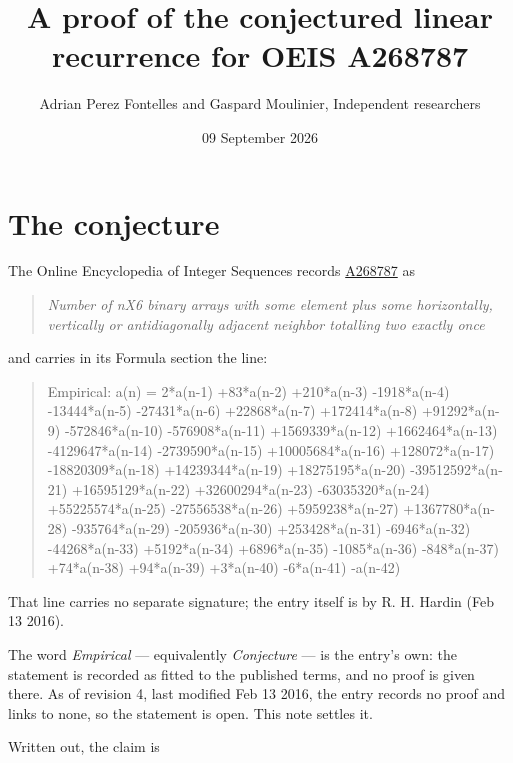 \documentclass[11pt]{article}
\title{A proof of the conjectured linear recurrence for OEIS A268787}
\author{Adrian Perez Fontelles and Gaspard Moulinier, Independent researchers}
\date{09 September 2026}
\theoremstyle{definition}
\begin{document}
\maketitle
\section{The conjecture}

The Online Encyclopedia of Integer Sequences records \href{https://oeis.org/A268787}{A268787} as

\begin{quote}\itshape Number of nX6 binary arrays with some element plus some horizontally, vertically or antidiagonally adjacent neighbor totalling two exactly once\end{quote}

and carries in its Formula section the line:

\begin{quote}\ttfamily Empirical: a(n) = 2*a(n-1) +83*a(n-2) +210*a(n-3) -1918*a(n-4) -13444*a(n-5) -27431*a(n-6) +22868*a(n-7) +172414*a(n-8) +91292*a(n-9) -572846*a(n-10) -576908*a(n-11) +1569339*a(n-12) +1662464*a(n-13) -4129647*a(n-14) -2739590*a(n-15) +10005684*a(n-16) +128072*a(n-17) -18820309*a(n-18) +14239344*a(n-19) +18275195*a(n-20) -39512592*a(n-21) +16595129*a(n-22) +32600294*a(n-23) -63035320*a(n-24) +55225574*a(n-25) -27556538*a(n-26) +5959238*a(n-27) +1367780*a(n-28) -935764*a(n-29) -205936*a(n-30) +253428*a(n-31) -6946*a(n-32) -44268*a(n-33) +5192*a(n-34) +6896*a(n-35) -1085*a(n-36) -848*a(n-37) +74*a(n-38) +94*a(n-39) +3*a(n-40) -6*a(n-41) -a(n-42)\end{quote}

That line carries no separate signature; the entry itself is by R. H. Hardin (Feb 13 2016).

The word {\itshape Empirical} --- equivalently {\itshape Conjecture} --- is the entry's own: the statement is recorded as fitted to the published terms, and no proof is given there. As of revision 4, last modified Feb 13 2016, the entry records no proof and links to none, so the statement is open. This note settles it.

Written out, the claim is
\end{document}
